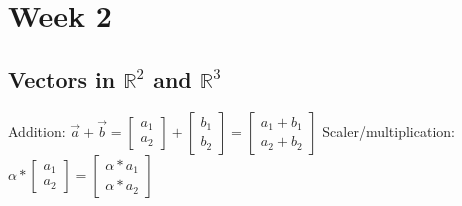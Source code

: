 \section{Week 2}
\subsection{Vectors in $\mathbb{R}^2$ and $\mathbb{R}^3$}

Addition:
$\vec{a} + \vec{b} = \begin{bmatrix} a_1 \\ a_2 \end{bmatrix} + \begin{bmatrix} b_1 \\ b_2 \end{bmatrix} = \begin{bmatrix} a_1 + b_1 \\ a_2 + b_2 \end{bmatrix}$
\newline
Scaler/multiplication: 
$\alpha * \begin{bmatrix} a_1 \\ a_2 \end{bmatrix} = \begin{bmatrix} \alpha * a_1 \\ \alpha * a_2 \end{bmatrix}$

